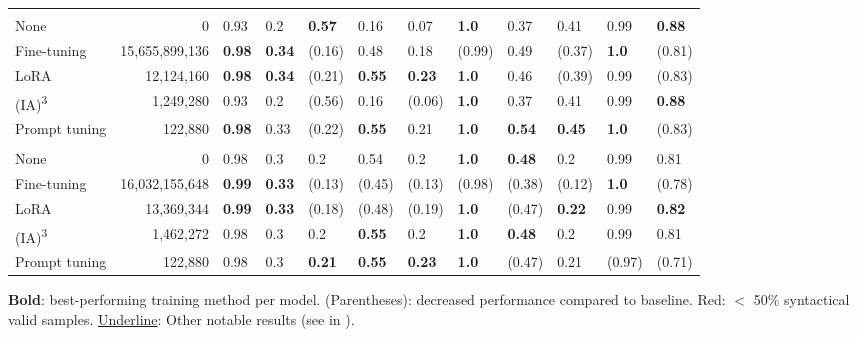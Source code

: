 \begin{table*}[htbp]
\begin{threeparttable}
\begin{tabularx}{\textwidth}{lrLLLLL!{\color{white}\ }LLLLL}
         \bigstrut \\*
        None & 0 & 0.93 & 0.2 & \textbf{0.57} & 0.16 & 0.07 & \textbf{1.0} & 0.37 & 0.41 & 0.99 & \textbf{0.88} \\
        Fine-tuning & 15,655,899,136 & \textbf{0.98} & \textbf{0.34} & (0.16) & 0.48 & 0.18 & (0.99) & 0.49 & (0.37) & \textbf{1.0} & (0.81) \\
        LoRA & 12,124,160 & \textbf{0.98} & \textbf{0.34} & (0.21) & \textbf{0.55} & \textbf{0.23} & \textbf{1.0} & 0.46 & (0.39) & 0.99 & (0.83) \\
        (IA)\textsuperscript{3} & 1,249,280 & 0.93 & 0.2 & (0.56) & 0.16 & (0.06) & \textbf{1.0} & 0.37 & 0.41 & 0.99 & \textbf{0.88} \\
        Prompt tuning & 122,880 & \textbf{0.98} & 0.33 & (0.22) & \textbf{0.55} & 0.21 & \textbf{1.0} & \textbf{0.54} & \textbf{0.45} & \textbf{1.0} & (0.83) \\

         \bigstrut \\*
        None & 0 & 0.98 & 0.3 & 0.2 & 0.54 & 0.2 & \textbf{1.0} & \textbf{0.48} & 0.2 & 0.99 & 0.81 \\
        Fine-tuning & 16,032,155,648 & \textbf{0.99} & \textbf{0.33} & (0.13) & (0.45) & (0.13) & (0.98) & (0.38) & (0.12) & \textbf{1.0} & (0.78) \\
        LoRA & 13,369,344 & \textbf{0.99} & \textbf{0.33} & (0.18) & (0.48) & (0.19) & \textbf{1.0} & (0.47) & \textbf{0.22} & 0.99 & \textbf{0.82} \\
        (IA)\textsuperscript{3} & 1,462,272 & 0.98 & 0.3 & 0.2 & \textbf{0.55} & 0.2 & \textbf{1.0} & \textbf{0.48} & 0.2 & 0.99 & 0.81 \\
        Prompt tuning & 122,880 & 0.98 & 0.3 & \textbf{0.21} & \textbf{0.55} & \textbf{0.23} & \textbf{1.0} & (0.47) & 0.21 & (0.97) & (0.71) \\

       \bottomrule
    \end{tabularx}
    \begin{tablenotes}[flushleft]\small
      \item \textbf{Bold}: best-performing training method per model. (Parentheses): decreased performance compared to baseline. \colorbox{red!10}{Red}: $<$ 50\% syntactical valid samples. \underline{Underline}: Other notable results (see in ).
    \end{tablenotes}
\end{threeparttable}
\end{table*}